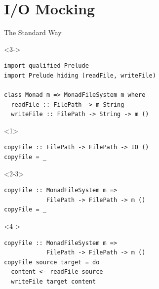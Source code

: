 \documentclass{beamer}
\begin{document}
\section{I/O Mocking}


\begin{frame}[fragile]{The Standard Way}
\begin{visibleenv}<3->
\begin{verbatim}
import qualified Prelude
import Prelude hiding (readFile, writeFile)

class Monad m => MonadFileSystem m where
  readFile :: FilePath -> m String
  writeFile :: FilePath -> String -> m ()
\end{verbatim}
\end{visibleenv}

\vspace{1.5em}

\begin{onlyenv}<1>
\begin{verbatim}
copyFile :: FilePath -> FilePath -> IO ()
copyFile = _
\end{verbatim}
\end{onlyenv}

\begin{onlyenv}<2-3>
\begin{verbatim}
copyFile :: MonadFileSystem m =>
            FilePath -> FilePath -> m ()
copyFile = _
\end{verbatim}
\end{onlyenv}

\begin{visibleenv}<4->
\begin{verbatim}
copyFile :: MonadFileSystem m =>
            FilePath -> FilePath -> m ()
copyFile source target = do
  content <- readFile source
  writeFile target content
\end{verbatim}
\end{visibleenv}
\end{frame}
\end{document}
